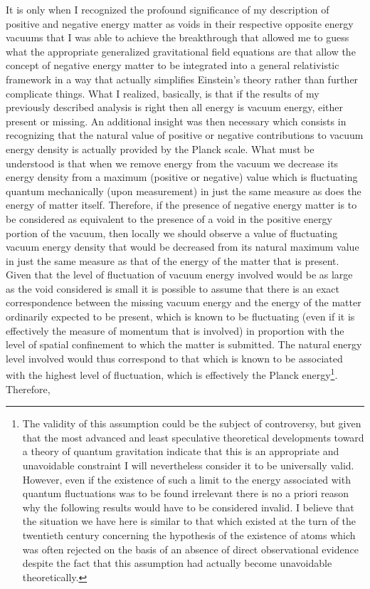 \documentclass[notitlepage,12pt]{report}
\begin{document}
It is only when I recognized the profound significance of my description of positive and negative energy matter as voids in their respective opposite energy vacuums that I was able to achieve the breakthrough that allowed me to guess what the appropriate generalized gravitational field equations are that allow the concept of negative energy matter to be integrated into a general relativistic framework in a way that actually simplifies Einstein's theory rather than further complicate things. What I realized, basically, is that if the results of my previously described analysis is right then all energy is vacuum energy, either present or missing. An additional insight was then necessary which consists in recognizing that the natural value of positive or negative contributions to vacuum energy density is actually provided by the Planck scale. What must be understood is that when we remove energy from the vacuum we decrease its energy density from a maximum (positive or negative) value which is fluctuating quantum mechanically (upon measurement) in just the same measure as does the energy of matter itself. Therefore, if the presence of negative energy matter is to be considered as equivalent to the presence of a void in the positive energy portion of the vacuum, then locally we should observe a value of fluctuating vacuum energy density that would be decreased from its natural maximum value in just the same measure as that of the energy of the matter that is present. Given that the level of fluctuation of vacuum energy involved would be as large as the void considered is small it is possible to assume that there is an exact correspondence between the missing vacuum energy and the energy of the matter ordinarily expected to be present, which is known to be fluctuating (even if it is effectively the measure of momentum that is involved) in proportion with the level of spatial confinement to which the matter is submitted. The natural energy level involved would thus correspond to that which is known to be associated with the highest level of fluctuation, which is effectively the Planck energy\footnote{The validity of this assumption could be the subject of controversy, but given that the most advanced and least speculative theoretical developments toward a theory of quantum gravitation indicate that this is an appropriate and unavoidable constraint I will nevertheless consider it to be universally valid. However, even if the existence of such a limit to the energy associated with quantum fluctuations was to be found irrelevant there is no a priori reason why the following results would have to be considered invalid. I believe that the situation we have here is similar to that which existed at the turn of the twentieth century concerning the hypothesis of the existence of atoms which was often rejected on the basis of an absence of direct observational evidence despite the fact that this assumption had actually become unavoidable theoretically.}. Therefore, 
\end{document}
